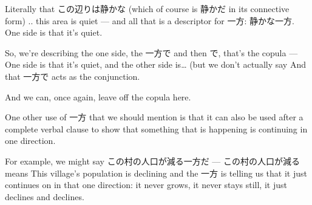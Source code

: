 Literally that この辺りは静かな (which of course is 静かだ in its connective form) .. this area is quiet --- and all that is a descriptor for 一方: 静かな一方. One side is that it's quiet.

{}

So, we're describing the one side, the 一方で and then で, that's the copula --- One side is that it's quiet, and the other side is\ldots{} (but we don't actually say  And that 一方で acts as the conjunction.

And we can, once again, leave off the copula here.

\thinrule

One other use of 一方 that we should mention is that it can also be used after a complete verbal clause to show that something that is happening is continuing in one direction.

{}

For example, we might say この村の人口が減る一方だ ---  この村の人口が減る means This village's population is declining and the 一方 is telling us that it just continues on in that one direction: it never grows, it never stays still, it just declines and declines.

\stopsectionlevel

\stopsectionlevel
